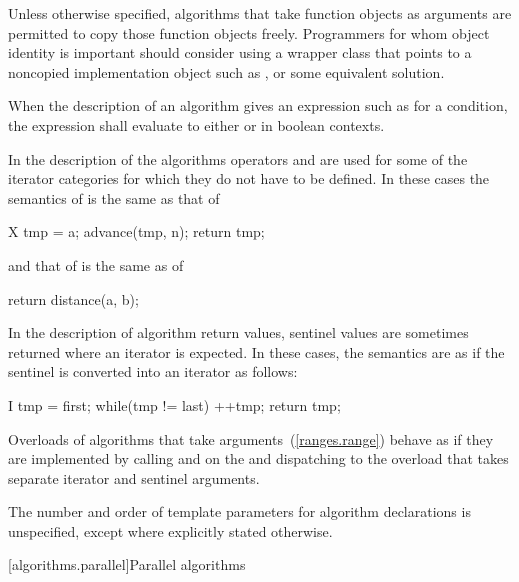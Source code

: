 \pnum
\begin{note}
Unless otherwise specified, algorithms that take function objects as arguments
are permitted to copy those function objects freely. Programmers for whom object
identity is important should consider using a wrapper class that points to a
noncopied implementation object such as , or some equivalent solution.
\end{note}

\pnum
When the description of an algorithm gives an expression such as
for a condition, the expression shall evaluate to
either  or  in boolean contexts.

\pnum
In the description of the algorithms operators
\tcode{+}
and
\tcode{-}
are used for some of the iterator categories for which
they do not have to be defined.
In these cases the semantics of
is the same as that of

\begin{codeblock}
X tmp = a;
advance(tmp, n);
return tmp;
\end{codeblock}

and that of
is the same as of

\begin{codeblock}
return distance(a, b);
\end{codeblock}

\begin{addedblock}
\pnum
In the description of algorithm return values, sentinel values are sometimes
returned where an iterator is expected. In these cases, the semantics are as
if the sentinel is converted into an iterator as follows:

\begin{codeblock}
I tmp = first;
while(tmp != last)
  ++tmp;
return tmp;
\end{codeblock}

\pnum
Overloads of algorithms that take  arguments~(\ref{ranges.range})
behave as if they are implemented by calling  and  on
the  and dispatching to the overload that takes separate
iterator and sentinel arguments.

\pnum
The number and order of template parameters for algorithm declarations
is unspecified, except where explicitly stated otherwise.
\end{addedblock}

[algorithms.parallel]{Parallel algorithms}

